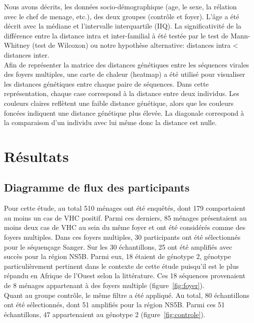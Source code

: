 \documentclass[a4paper,12pt]{article}
\begin{document}
Nous avons décrits, les données socio-démographique (age, le sexe, la rélation avec le chef de menage, etc.), des deux groupes (contrôle et foyer). L'âge a été décrit avec la médiane et l’intervalle interquartile (IIQ). La significativité de la différence entre la distance intra et inter-familial à été testée par le test de Mann-Whitney (test de Wilcoxon) ou notre hypothèse alternative: distances intra < distances inter. \\
Afin de représenter la matrice des distances génétiques entre les séquences virales des foyers multiples, une carte de chaleur (heatmap) a été utilisé pour visualiser les distances génétiques entre chaque paire de séquences. Dans cette représentation, chaque case correspond à la distance entre deux individus. Les couleurs claires reflètent une faible distance génétique, alors que les couleurs foncées indiquent une distance génétique plus élevée. La diagonale correspond à la comparaison d'un individu avec lui même donc la distance est nulle. 


\newpage 
\section{Résultats }

\subsection{Diagramme de flux des participants}

Pour cette étude, au total 510 ménages ont été enquêtés, dont 179 comportaient au moins un cas de VHC positif. Parmi ces derniers, 85 ménages présentaient au moins deux cas de VHC au sein du même foyer et ont été considérés comme des foyers multiples. Dans ces foyers multiples, 30 participants ont été sélectionnés pour le séquençage Sanger. Sur les 30 échantillons, 25 ont été amplifiés avec succès pour la région NS5B. Parmi eux, 18 étaient de génotype 2, génotype particulièrement pertinent dans le contexte de cette étude puisqu’il est le plus répandu en Afrique de l’Ouest selon la littérature. Ces 18 séquences provenaient de 8 ménages appartenant à des foyers multiple (figure~\ref{fig:foyer}). \\
Quant au groupe contrôle, le même filtre a été appliqué. Au total, 80 échantillons ont été sélectionnés, dont 51 amplifiés pour la région NS5B. Parmi ces 51 échantillons, 47 appartenaient au génotype 2 (figure~\ref{fig:controle}). 
\end{document}
